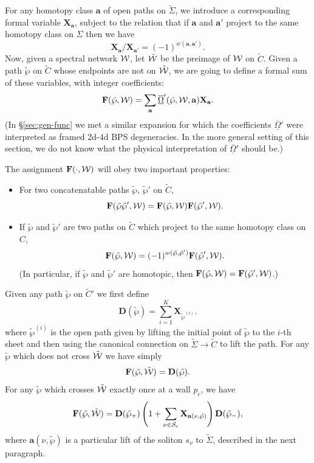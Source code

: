 \documentclass[11pt,a4paper]{article}
\def\twp{\tilde\wp}
\def\wnet {{\cal W}}
\def\CS {{\cal S}}
\def\ba{\mathbf{a}}
\def\bD{\mathbf{D}}
\def\bF{\mathbf{F}}
\def\bX{\mathbf{X}}
\def\wnet {{\cal W}}
\def\CS {{\cal S}}
\newcommand\fro{{\overline{\underline{\Omega}}}}
\begin{document}
For any homotopy class $\ba$ of open paths on $\tilde\Sigma$, we introduce a corresponding
formal variable $\bX_\ba$,
subject to the relation that if $\ba$ and $\ba'$ project to the same homotopy class on
$\Sigma$
then we have
\begin{equation} \label{eq:bold-winding-rule-2}
 \bX_\ba / \bX_{\ba'} = (-1)^{w(\ba,\ba')}.
\end{equation}
Now, given a spectral network $\wnet$, let $\tilde \wnet$ be the preimage of $\wnet$ on
$\tilde C$.  Given a
path $\twp$ on $\tilde C$ whose endpoints are not on $\tilde \wnet$,
we are going to define a formal sum of these variables, with integer coefficients:
\begin{equation} \label{eq:F-expand}
 \bF(\tilde \wp, \wnet) = \sum_{\ba} \fro'(\tilde \wp, \wnet, \ba) \bX_{\ba}.
\end{equation}
(In \S\ref{sec:gen-func} we met a similar expansion for which the coefficients $\fro'$
were interpreted as framed 2d-4d BPS degeneracies.  In the more general setting of this section,
we do not know what the physical interpretation of $\fro'$ should be.)

The assignment $\bF(\cdot, \wnet)$ will obey two important properties:
\begin{itemize}
 \item For two concatenatable paths $\twp$, $\twp'$ on $\tilde C$,
\begin{equation} \label{eq:composition-bold}
\bF(\twp \twp', \wnet) = \bF(\twp, \wnet) \bF(\twp', \wnet).
\end{equation}

\item If $\twp$ and $\twp'$ are two paths on $\tilde C$ which project to the same
homotopy class on $C$,
\begin{equation} \label{eq:twisted-homotopy}
\bF(\twp, \wnet) = (-1)^{w(\twp, \twp')} \bF(\twp', \wnet).
\end{equation}
(In particular, if $\twp$ and $\twp'$ are homotopic,
then $\bF(\twp, \wnet) = \bF(\twp', \wnet)$.)
\end{itemize}
Given any path $\twp$ on $\tilde C'$ we first define
\begin{equation}
 \bD(\twp) = \sum_{i=1}^K \bX_{\twp^{(i)}}.
\end{equation}
where  $\twp^{(i)}$ is the open path given by
lifting the initial point of $\twp$ to the $i$-th sheet and then using the
canonical connection on $\tilde \Sigma \to \tilde C$ to lift the path.
For any $\twp$ which does not cross $\tilde \wnet$ we have simply
\begin{equation} \label{eq:F-no-cross}
 \bF(\twp, \tilde\wnet) = \bD(\twp).
\end{equation}
For any $\twp$ which crosses $\tilde \wnet$ exactly once at a wall $p_c$, we have
\begin{equation} \label{eq:F-one-cross}
 \bF(\twp, \tilde\wnet) = \bD(\twp_+) \left(1 + \sum_{\nu \in \CS_c} \bX_{\ba(\nu,\twp)}\right) \bD(\twp_-),
\end{equation}
where $\ba(\nu,\twp)$ is a particular lift of the soliton $s_\nu$
to $\tilde\Sigma$, described in the next paragraph.
\end{document}
